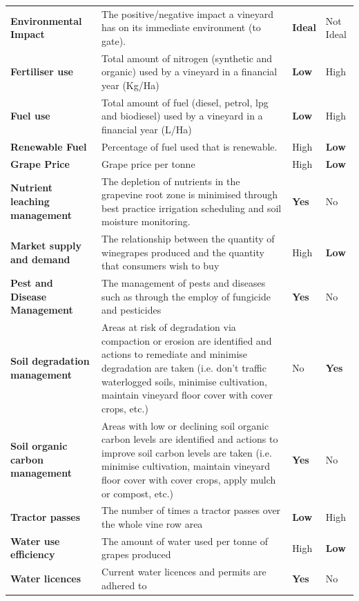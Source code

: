 \begin{table}[h]
\begin{tabular}{@{}llll@{}}
    \textbf{Environmental Impact} & The positive/negative impact a vineyard has on its immediate environment (to gate). & \textbf{Ideal} & Not Ideal \\
    \textbf{Fertiliser use} & Total amount of nitrogen (synthetic and organic) used by a vineyard in a financial year (Kg/Ha) & \textbf{Low} & High \\
    \textbf{Fuel use} & Total amount of fuel (diesel, petrol, lpg and biodiesel) used by a vineyard in a financial year (L/Ha) & \textbf{Low} & High \\
    \textbf{Renewable Fuel} & Percentage of fuel used that is renewable. & High & \textbf{Low} \\
    \textbf{Grape Price} & Grape price per tonne & High & \textbf{Low} \\
    \textbf{Nutrient leaching management} & The depletion of nutrients in the grapevine root zone is minimised through best practice irrigation scheduling and soil moisture monitoring. & \textbf{Yes} & No \\
    \textbf{Market supply and demand} & The relationship between the quantity of winegrapes produced and the quantity that consumers wish to buy & High & \textbf{Low} \\
    \textbf{Pest and Disease Management} & The management of pests and diseases such as through the employ of fungicide and pesticides & \textbf{Yes} & No \\
    \textbf{Soil degradation management} & Areas at risk of degradation via compaction or erosion are identified and actions to remediate and minimise degradation are taken (i.e. don’t traffic waterlogged soils, minimise cultivation, maintain vineyard floor cover with cover crops, etc.) & No & \textbf{Yes} \\
    \textbf{Soil organic carbon management} & Areas with low or declining soil organic carbon levels are identified and actions to improve soil carbon levels are taken (i.e. minimise cultivation, maintain vineyard floor cover with cover crops, apply mulch or compost, etc.) & \textbf{Yes} & No \\
    \textbf{Tractor passes} & The number of times a tractor passes over the whole vine row area & \textbf{Low} & High \\
    \textbf{Water use efficiency} & The amount of water used per tonne of grapes produced & High & \textbf{Low} \\
    \textbf{Water licences} & Current water licences and permits are adhered to & \textbf{Yes} & No \\

\end{tabular}
\end{table}
